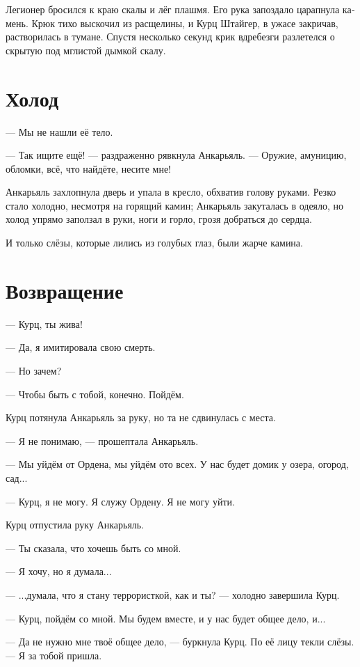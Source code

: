 \documentclass[a4paper,10pt,fleqn]{book}\usepackage{polyglossia}\setdefaultlanguage[babelshorthands=true]{russian}\setotherlanguage{english}\defaultfontfeatures{Ligatures=TeX,Mapping=tex-text}\usepackage{xcolor}\newcommand{\ml}[3]{#2}
\begin{document}
Легионер бросился к краю скалы и лёг плашмя.
Его рука запоздало царапнула камень.
Крюк тихо выскочил из расщелины, и Курц Штайгер, в ужасе закричав, растворилась в тумане.
Спустя несколько секунд крик вдребезги разлетелся о скрытую под мглистой дымкой скалу. 

\section{Холод}

--- Мы не нашли её тело.

--- Так ищите ещё! --- раздраженно рявкнула Анкарьяль.
--- Оружие, амуницию, обломки, всё, что найдёте, несите мне!

Анкарьяль захлопнула дверь и упала в кресло, обхватив голову руками.
Резко стало холодно, несмотря на горящий камин;
Анкарьяль закуталась в одеяло, но холод упрямо заползал в руки, ноги и горло, грозя добраться до сердца.

И только слёзы, которые лились из голубых глаз, были жарче камина. 

\section{Возвращение}

--- Курц, ты жива!

--- Да, я имитировала свою смерть.

--- Но зачем?

--- Чтобы быть с тобой, конечно.
Пойдём.

Курц потянула Анкарьяль за руку, но та не сдвинулась с места.

--- Я не понимаю, --- прошептала Анкарьяль.

--- Мы уйдём от Ордена, мы уйдём ото всех.
У нас будет домик у озера, огород, сад...

--- Курц, я не могу.
Я служу Ордену.
Я не могу уйти.

Курц отпустила руку Анкарьяль.

--- Ты сказала, что хочешь быть со мной.

--- Я хочу, но я думала...

--- ...думала, что я стану террористкой, как и ты? --- холодно завершила Курц.

--- Курц, пойдём со мной.
Мы будем вместе, и у нас будет общее дело, и...

--- Да не нужно мне твоё общее дело, --- буркнула Курц.
По её лицу текли слёзы.
--- Я за тобой пришла.
\end{document}
